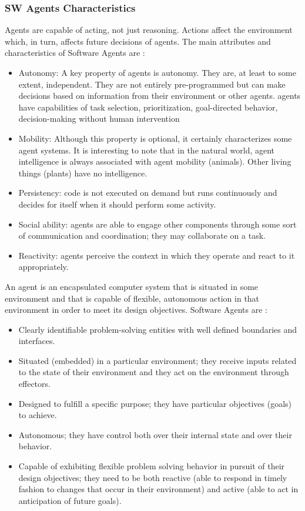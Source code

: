 \documentclass[12pt,a4paper,final,twoside,onecolumn,titlepage]{book}
\begin{document}
\subsubsection{SW Agents Characteristics}
Agents are capable of acting, not just reasoning. Actions affect the environment which, in turn, affects future decisions of agents. The main attributes and characteristics of Software Agents are \cite{MNAS02}:
\begin{itemize}
\item Autonomy: A key property of agents is autonomy. They are, at least to some extent, independent. They are not entirely pre-programmed but can make decisions based on information from their environment or other agents. agents have capabilities of task selection, prioritization, goal-directed behavior, decision-making without human intervention
\item Mobility: Although this property is optional, it certainly characterizes some agent systems. It is interesting to note that in the natural world, agent intelligence is always associated with agent mobility (animals). Other living things (plants) have no intelligence.
\item Persistency: code is not executed on demand but runs continuously and decides for itself when it should perform some activity.
\item Social ability: agents are able to engage other components through some sort of communication and coordination; they may collaborate on a task.
\item Reactivity: agents perceive the context in which they operate and react to it appropriately.
\end{itemize}
An agent is an encapsulated computer system that is situated in some environment and that is capable of flexible, autonomous action in that environment in order to meet its design objectives. Software Agents are \cite{R38}: 
\begin{itemize}
\item Clearly identifiable problem-solving entities with well defined boundaries and interfaces. 
\item Situated (embedded) in a particular environment; they receive inputs related to the state of their environment and they act on the environment through effectors.
\item Designed to fulfill a specific purpose; they have particular objectives (goals) to achieve. 
\item Autonomous; they have control both over their internal state and over their behavior. 
\item Capable of exhibiting flexible problem solving behavior in pursuit of their design objectives; they need to be both reactive (able to respond in timely fashion to changes that occur in their environment) and active (able to act in anticipation of future goals). 
\end{itemize}
\end{document}
